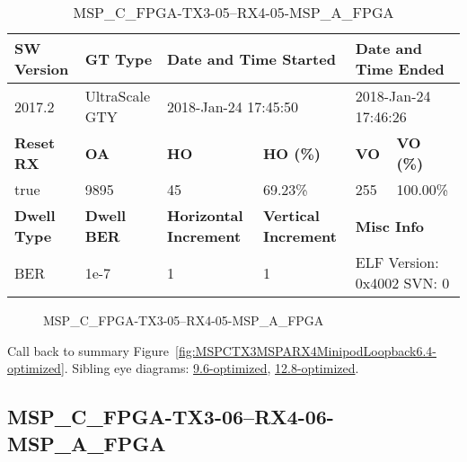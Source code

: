 \begin{table}[h]
\centering
\caption{MSP\_C\_FPGA-TX3-05--RX4-05-MSP\_A\_FPGA}
\label{tab:MSPCFPGATX305RX405MSPAFPGA6.4-optimized}
\begin{tabular}{@{}|l|l|l|l|l|l|@{}}
\toprule
\textbf{SW Version}                & \textbf{GT Type}   & \multicolumn{2}{l|}{\textbf{Date and Time Started}}            & \multicolumn{2}{l|}{\textbf{Date and Time Ended}}        \\ \midrule
2017.2                       & UltraScale GTY          & \multicolumn{2}{l|}{2018-Jan-24 17:45:50}                   & \multicolumn{2}{l|}{2018-Jan-24 17:46:26}               \\ \midrule
\textbf{Reset RX}                  & \textbf{OA} & \textbf{HO}   & \textbf{HO (\%)} & \textbf{VO} & \textbf{VO (\%)} \\ \midrule
true & 9895        & 45          & 69.23\%        & 255        & 100.00\%       \\ \midrule
\textbf{Dwell Type}                & \textbf{Dwell BER} & \textbf{Horizontal Increment} & \textbf{Vertical Increment}    & \multicolumn{2}{l|}{\textbf{Misc Info}}                  \\ \midrule
BER                            & 1e-7        & 1        & 1           & \multicolumn{2}{l|}{ELF Version: 0x4002 SVN: 0}                         \\ \bottomrule
\end{tabular}
\end{table}

\begin{figure}[h]
\caption{MSP\_C\_FPGA-TX3-05--RX4-05-MSP\_A\_FPGA} \label{fig:MSPCFPGATX305RX405MSPAFPGA6.4-optimized}
\end{figure}

Call back to summary Figure~\ref{fig:MSPCTX3MSPARX4MinipodLoopback6.4-optimized}.
Sibling eye diagrams: \hyperref[sec:MSPCFPGATX305RX405MSPAFPGA9.6-optimized]{9.6-optimized}, \hyperref[sec:MSPCFPGATX305RX405MSPAFPGA12.8-optimized]{12.8-optimized}.

\clearpage
\newpage


\subsection{MSP\_C\_FPGA-TX3-06--RX4-06-MSP\_A\_FPGA}\label{sec:MSPCFPGATX306RX406MSPAFPGA6.4-optimized}

